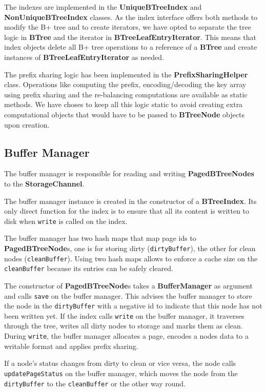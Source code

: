 \documentclass[11pt,a4paper,oneside]{article}
\begin{document}
The indexes are implemented in the \textbf{UniqueBTreeIndex} and \textbf{NonUniqueBTreeIndex} classes. As the index interface offers both methods to modify the B+ tree and to create iterators, we have opted to separate the tree logic in \textbf{BTree} and the iterator in \textbf{BTreeLeafEntryIterator}. This means that index objects delete all B+ tree operations to a reference of a \textbf{BTree} and create instances of \textbf{BTreeLeafEntryIterator} as needed.

The prefix sharing logic has been implemented in the \textbf{PrefixSharingHelper} class. Operations like computing the prefix, encoding/decoding the key array using prefix sharing and the re-balancing computations are available as static methods. We have choses to keep all this logic static to avoid creating extra computational objects that would have to be passed to \textbf{BTreeNode} objects upon creation.

\subsection{Buffer Manager} %
\label{sub:buffer_manager}
The buffer manager is responsible for reading and writing \textbf{PagedBTreeNodes} to the \textbf{StorageChannel}.

The buffer manager instance is created in the constructor of a \textbf{BTreeIndex}. 
Its only direct function for the index is to ensure that all its content is written to disk when \texttt{write} is called on the index.

The buffer manager has two hash maps that map page ids to \textbf{PagedBTreeNode}s, one is for storing dirty (\texttt{dirtyBuffer}), 
the other for clean nodes (\texttt{cleanBuffer}). 
Using two hash maps allows to enforce a cache size on the \texttt{cleanBuffer} because its entries can be safely cleared.

The constructor of \textbf{PagedBTreeNode}s takes a \textbf{BufferManager} as argument and calls \texttt{save} on the buffer manager.
This advises the buffer manager to store the node in the \texttt{dirtyBuffer} with a negative id to indicate that this node has not been written yet.
If the index calls \texttt{write} on the buffer manager, it traverses through the tree, writes all dirty nodes to storage and marks them as clean.
During \texttt{write}, the buffer manager allocates a page, encodes a nodes data to a writable format and applies prefix sharing.

If a node's status changes from dirty to clean or vice versa, the node calls \texttt{updatePageStatus} on the buffer manager, 
which moves the node from the \texttt{dirtyBuffer} to the \texttt{cleanBuffer} or the other way round.
\end{document}
